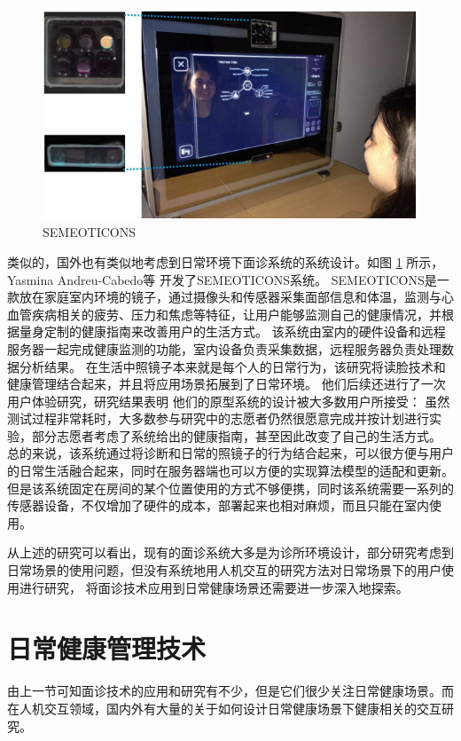 \begin{figure}[h]
    \centering
    \includegraphics[width=12cm]{images/mirror.png}
    \caption{SEMEOTICONS}
    \label{fig:seme}
\end{figure}
类似的，国外也有类似地考虑到日常环境下面诊系统的系统设计。如图 \ref{fig:seme} 所示，Yasmina Andreu-Cabedo等 \cite{andreu2015mirror}开发了SEMEOTICONS系统。
SEMEOTICONS是一款放在家庭室内环境的镜子，通过摄像头和传感器采集面部信息和体温，监测与心血管疾病相关的疲劳、压力和焦虑等特征，让用户能够监测自己的健康情况，并根据量身定制的健康指南来改善用户的生活方式。
该系统由室内的硬件设备和远程服务器一起完成健康监测的功能，室内设备负责采集数据，远程服务器负责处理数据分析结果。
在生活中照镜子本来就是每个人的日常行为，该研究将读脸技术和健康管理结合起来，并且将应用场景拓展到了日常环境。
他们后续还进行了一次用户体验研究，研究结果表明\cite{coppini2017user} 他们的原型系统的设计被大多数用户所接受： 虽然测试过程非常耗时，大多数参与研究中的志愿者仍然很愿意完成并按计划进行实验，部分志愿者考虑了系统给出的健康指南，甚至因此改变了自己的生活方式。
总的来说，该系统通过将诊断和日常的照镜子的行为结合起来，可以很方便与用户的日常生活融合起来，同时在服务器端也可以方便的实现算法模型的适配和更新。
但是该系统固定在房间的某个位置使用的方式不够便携，同时该系统需要一系列的传感器设备，不仅增加了硬件的成本，部署起来也相对麻烦，而且只能在室内使用。

从上述的研究可以看出，现有的面诊系统大多是为诊所环境设计，部分研究考虑到日常场景的使用问题，但没有系统地用人机交互的研究方法对日常场景下的用户使用进行研究，
将面诊技术应用到日常健康场景还需要进一步深入地探索。

\section{日常健康管理技术}

由上一节可知面诊技术的应用和研究有不少，但是它们很少关注日常健康场景。而在人机交互领域，国内外有大量的关于如何设计日常健康场景下健康相关的交互研究。

